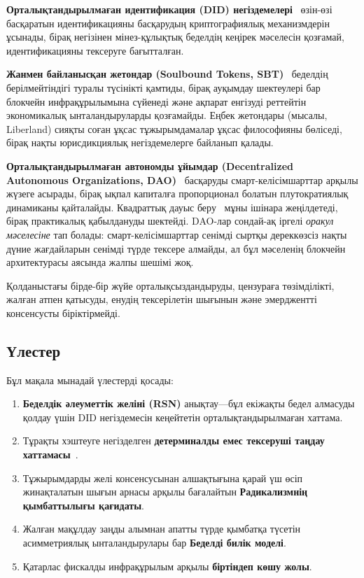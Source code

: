 \documentclass[11pt,a4paper,twocolumn]{article}
\begin{document}
\textbf{Орталықтандырылмаған идентификация (DID) негіздемелері}~\cite{did2022} өзін-өзі басқаратын идентификацияны басқарудың криптографиялық механизмдерін ұсынады, бірақ негізінен мінез-құлықтық беделдің кеңірек мәселесін қозғамай, идентификацияны тексеруге бағытталған.

\textbf{Жанмен байланысқан жетондар (Soulbound Tokens, SBT)}~\cite{weyl2022} беделдің берілмейтіндігі туралы түсінікті қамтиды, бірақ ауқымдау шектеулері бар блокчейн инфрақұрылымына сүйенеді және ақпарат енгізуді реттейтін экономикалық ынталандыруларды қозғамайды. Еңбек жетондары (мысалы, Liberland) сияқты соған ұқсас тұжырымдамалар ұқсас философияны бөліседі, бірақ нақты юрисдикциялық негіздемелерге байланып қалады.

\textbf{Орталықтандырылмаған автономды ұйымдар (Decentralized Autonomous Organizations, DAO)}~\cite{buterin2014} басқаруды смарт-келісімшарттар арқылы жүзеге асырады, бірақ ықпал капиталға пропорционал болатын плутократиялық динамиканы қайталайды. Квадраттық дауыс беру~\cite{buterin2019} мұны ішінара жеңілдетеді, бірақ практикалық қабылдануды шектейді. DAO-лар сондай-ақ іргелі \emph{оракул мәселесіне} тап болады: смарт-келісімшарттар сенімді сыртқы дереккөзсіз нақты дүние жағдайларын сенімді түрде тексере алмайды, ал бұл мәселенің блокчейн архитектурасы аясында жалпы шешімі жоқ.

Қолданыстағы бірде-бір жүйе орталықсыздандыруды, цензураға төзімділікті, жалған атпен қатысуды, енудің тексерілетін шығынын және эмерджентті консенсусты біріктірмейді.

\subsection{Үлестер}

Бұл мақала мынадай үлестерді қосады:
\begin{enumerate}[nosep]
\item \textbf{Беделдік әлеуметтік желіні (RSN)} анықтау---бұл екіжақты бедел алмасуды қолдау үшін DID негіздемесін кеңейтетін орталықтандырылмаған хаттама.
\item Тұрақты хэштеуге негізделген \textbf{детерминалды емес тексеруші таңдау хаттамасы}~\cite{karger1997}.
\item Тұжырымдарды желі консенсусынан алшақтығына қарай үш өсіп жинақталатын шығын арнасы арқылы бағалайтын \textbf{Радикализмнің қымбаттылығы қағидаты}.
\item Жалған мақұлдау заңды алымнан апатты түрде қымбатқа түсетін асимметриялық ынталандырулары бар \textbf{Беделді билік моделі}.
\item Қатарлас фискалды инфрақұрылым арқылы \textbf{біртіндеп көшу жолы}.
\end{enumerate}
\end{document}
